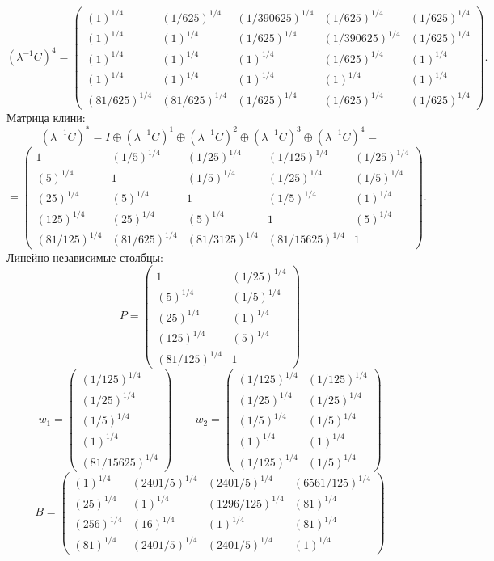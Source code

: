 $$(\lambda^{-1}C)^4 = \begin{pmatrix}
(1)^{1/4} & (1/625)^{1/4} & (1/390625)^{1/4} & (1/625)^{1/4} & (1/625)^{1/4}\\
(1)^{1/4} & (1)^{1/4} & (1/625)^{1/4} & (1/390625)^{1/4} & (1/625)^{1/4}\\
(1)^{1/4} & (1)^{1/4} & (1)^{1/4} & (1/625)^{1/4} & (1)^{1/4}\\
(1)^{1/4} & (1)^{1/4} & (1)^{1/4} & (1)^{1/4} & (1)^{1/4}\\
(81/625)^{1/4} & (81/625)^{1/4} & (1/625)^{1/4} & (1/625)^{1/4} & (1/625)^{1/4}
\end{pmatrix}.
$$
Матрица клини:
$$(\lambda^{-1}C)^* = I \oplus (\lambda^{-1}C)^1 \oplus (\lambda^{-1}C)^2 \oplus (\lambda^{-1}C)^3 \oplus (\lambda^{-1}C)^4 = $$
$$ = \begin{pmatrix}
1 & (1/5)^{1/4} & (1/25)^{1/4} & (1/125)^{1/4} & (1/25)^{1/4}\\
(5)^{1/4} & 1 & (1/5)^{1/4} & (1/25)^{1/4} & (1/5)^{1/4}\\
(25)^{1/4} & (5)^{1/4} & 1 & (1/5)^{1/4} & (1)^{1/4}\\
(125)^{1/4} & (25)^{1/4} & (5)^{1/4} & 1 & (5)^{1/4}\\
(81/125)^{1/4} & (81/625)^{1/4} & (81/3125)^{1/4} & (81/15625)^{1/4} & 1
\end{pmatrix}.
$$
Линейно независимые столбцы:
$$P = \begin{pmatrix}
1 & (1/25)^{1/4}\\
(5)^{1/4} & (1/5)^{1/4}\\
(25)^{1/4} & (1)^{1/4}\\
(125)^{1/4} & (5)^{1/4}\\
(81/125)^{1/4} & 1
\end{pmatrix}
$$
$$w_1 = \begin{pmatrix}
(1/125)^{1/4}\\
(1/25)^{1/4}\\
(1/5)^{1/4}\\
(1)^{1/4}\\
(81/15625)^{1/4}
\end{pmatrix}
\qquad w_2 = \begin{pmatrix}
(1/125)^{1/4} & (1/125)^{1/4}\\
(1/25)^{1/4} & (1/25)^{1/4}\\
(1/5)^{1/4} & (1/5)^{1/4}\\
(1)^{1/4} & (1)^{1/4}\\
(1/125)^{1/4} & (1/5)^{1/4}
\end{pmatrix}
$$
$$B = \begin{pmatrix}
(1)^{1/4} & (2401/5)^{1/4} & (2401/5)^{1/4} & (6561/125)^{1/4}\\
(25)^{1/4} & (1)^{1/4} & (1296/125)^{1/4} & (81)^{1/4}\\
(256)^{1/4} & (16)^{1/4} & (1)^{1/4} & (81)^{1/4}\\
(81)^{1/4} & (2401/5)^{1/4} & (2401/5)^{1/4} & (1)^{1/4}
\end{pmatrix}
$$
